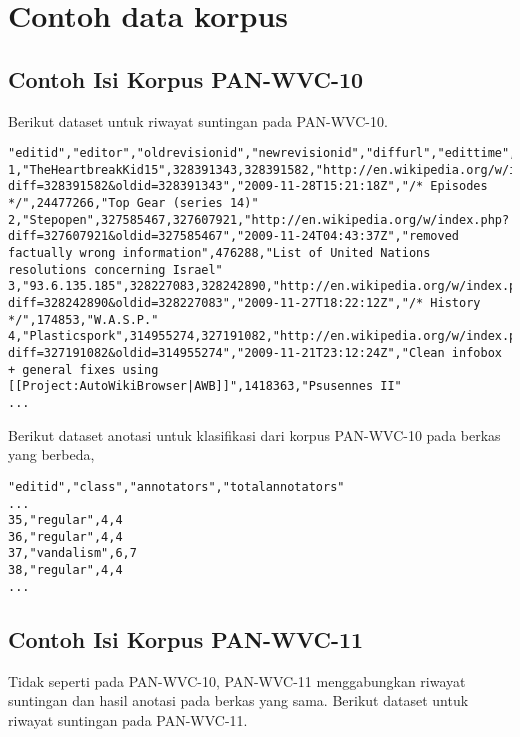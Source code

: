 \documentclass[12pt,a4paper,titlepage]{article}
\begin{document}
\newpage
\appendix
\section{Contoh data korpus}

\subsection{Contoh Isi Korpus PAN-WVC-10}

Berikut dataset untuk riwayat suntingan pada PAN-WVC-10.

\begin{lstlisting}
"editid","editor","oldrevisionid","newrevisionid","diffurl","edittime","editcomment","articleid","articletitle"
1,"TheHeartbreakKid15",328391343,328391582,"http://en.wikipedia.org/w/index.php?diff=328391582&oldid=328391343","2009-11-28T15:21:18Z","/* Episodes */",24477266,"Top Gear (series 14)"
2,"Stepopen",327585467,327607921,"http://en.wikipedia.org/w/index.php?diff=327607921&oldid=327585467","2009-11-24T04:43:37Z","removed factually wrong information",476288,"List of United Nations resolutions concerning Israel"
3,"93.6.135.185",328227083,328242890,"http://en.wikipedia.org/w/index.php?diff=328242890&oldid=328227083","2009-11-27T18:22:12Z","/* History */",174853,"W.A.S.P."
4,"Plasticspork",314955274,327191082,"http://en.wikipedia.org/w/index.php?diff=327191082&oldid=314955274","2009-11-21T23:12:24Z","Clean infobox + general fixes using [[Project:AutoWikiBrowser|AWB]]",1418363,"Psusennes II"
...
\end{lstlisting}

Berikut dataset anotasi untuk klasifikasi dari korpus PAN-WVC-10 pada berkas yang berbeda,

\begin{lstlisting}
"editid","class","annotators","totalannotators"
...
35,"regular",4,4
36,"regular",4,4
37,"vandalism",6,7
38,"regular",4,4
...
\end{lstlisting}

\newpage
\subsection{Contoh Isi Korpus PAN-WVC-11}

Tidak seperti pada PAN-WVC-10, PAN-WVC-11 menggabungkan riwayat suntingan dan hasil anotasi pada berkas yang sama.
Berikut dataset untuk riwayat suntingan pada PAN-WVC-11.
\end{document}
